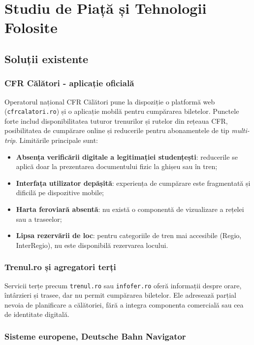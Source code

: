\documentclass[12pt,a4paper]{report}
\begin{document}
\chapter{Studiu de Piață și Tehnologii Folosite}

\section{Soluții existente}

\subsection{CFR Călători - aplicație oficială}

Operatorul național CFR Călători pune la dispoziție o platformă web (\texttt{cfrcalatori.ro}) și o aplicație mobilă pentru cumpărarea biletelor. Punctele forte includ disponibilitatea tuturor trenurilor și rutelor din rețeaua CFR, posibilitatea de cumpărare online și reducerile pentru abonamentele de tip \textit{multi-trip}. Limitările principale sunt:
\begin{itemize}
  \item \textbf{Absența verificării digitale a legitimației studențești}: reducerile se aplică doar la prezentarea documentului fizic la ghișeu sau în tren;
  \item \textbf{Interfața utilizator depășită}: experiența de cumpărare este fragmentată și dificilă pe dispozitive mobile;
  \item \textbf{Harta feroviară absentă}: nu există o componentă de vizualizare a rețelei sau a traseelor;
  \item \textbf{Lipsa rezervării de loc}: pentru categoriile de tren mai accesibile (Regio, InterRegio), nu este disponibilă rezervarea locului.
\end{itemize}

\subsection{Trenul.ro și agregatori terți}

Servicii terțe precum \texttt{trenul.ro} sau \texttt{infofer.ro} oferă informații despre orare, întârzieri și trasee, dar nu permit cumpărarea biletelor. Ele adresează parțial nevoia de planificare a călătoriei, fără a integra componenta comercială sau cea de identitate digitală.

\subsection{Sisteme europene, Deutsche Bahn Navigator}
\end{document}
